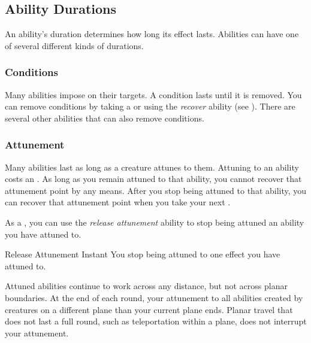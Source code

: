     \subsection{Ability Durations}\label{Ability Durations}

        An ability's duration determines how long its effect lasts.
        Abilities can have one of several different kinds of durations.

        \subsubsection{Conditions}\label{Conditions}
            Many abilities impose  on their targets.
            A condition lasts until it is removed.
            You can remove conditions by taking a  or using the \textit{recover} ability (see ).
            There are several other abilities that can also remove conditions.

        \subsubsection{Attunement}\label{Attunement}
            Many abilities last as long as a creature attunes to them.
            Attuning to an ability costs an .
            As long as you remain attuned to that ability, you cannot recover that attunement point by any means.
            After you stop being attuned to that ability, you can recover that attunement point when you take your next .

            As a , you can use the \textit{release attunement} ability to stop being attuned an ability you have attuned to.
            \begin{instantability}{Release Attunement}
                Instant
                \rankline
                You stop being attuned to one effect you have attuned to.
            \end{instantability}

            Attuned abilities continue to work across any distance, but not across planar boundaries.
            At the end of each round, your attunement to all abilities created by creatures on a different plane than your current plane ends.
            Planar travel that does not last a full round, such as teleportation within a plane, does not interrupt your attunement.

